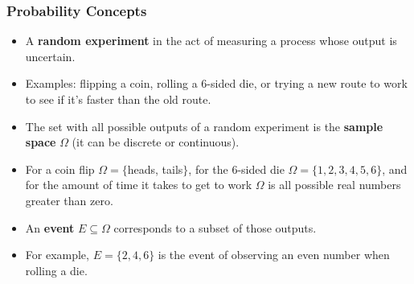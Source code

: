 \documentclass[handout]{beamer}
\begin{document}
\begin{frame}\frametitle{Probability Concepts}
\scriptsize{

\begin{itemize}
 \item A \textbf{random experiment} in the act of measuring a process whose output is uncertain. 
 \item Examples: flipping a coin, rolling a 6-sided die, or trying a new route to work to see if it’s faster than the old route.
 \item The set with all possible outputs of a random experiment is the \textbf{sample space} $\Omega$ (it can be discrete or continuous).
 \item For a coin flip  $\Omega = \{$heads, tails$\}$, for the 6-sided die  $\Omega = \{1,2,3,4,5,6\}$, and  for the amount of time it takes to get to work $\Omega$ is all possible real numbers greater than zero.
 \item An \textbf{event} $E \subseteq \Omega$ corresponds to a subset of those outputs.
 \item For example, $E = \{ 2,4,6 \}$ is the event of observing an even number when rolling a die.
\end{itemize}

}

\end{frame}
\end{document}
